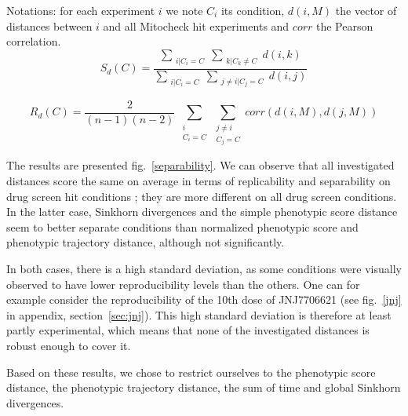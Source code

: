 Notations: for each experiment $i$ we note $C_i$ its condition, $d(i,M)$ the vector of distances between $i$ and all Mitocheck hit experiments and $corr$ the Pearson correlation.
\begin{equation}
S_d(C)=\dfrac{\sum_{\substack{i|C_i= C}} \sum_{\substack{k|C_k\neq C}} d(i,k)}{\sum_{\substack{i|C_i= C}} \sum_{\substack{j\neq i| C_j = C}} d(i,j)}
\label{sepa}
\end{equation}

\begin{equation}
R_d(C)=\dfrac{2}{(n-1)(n-2)}~ \sum_{\substack{i\\C_i= C}} \sum_{\substack{j\neq i\\ C_j = C}} corr(d(i,M), d(j,M))
\label{replica}
\end{equation}

The results are presented fig.~\ref{separability}. We can observe that all investigated distances score the same on average in terms of replicability and separability on drug screen hit conditions ; they are more different on all drug screen conditions. In the latter case, Sinkhorn divergences and the simple phenotypic score distance seem to better separate conditions than normalized phenotypic score and phenotypic trajectory distance, although not significantly. 

In both cases, there is a high standard deviation, as some conditions were visually observed to have lower reproducibility levels than the others. One can for example consider the reproducibility of the 10th dose of JNJ7706621 (see fig.~\ref{jnj} in appendix, section~\ref{sec:jnj}). This high standard deviation is therefore at least partly experimental, which means that none of the investigated distances is robust enough to cover it.

Based on these results, we chose to restrict ourselves to the phenotypic score distance, the phenotypic trajectory distance, the sum of time and global Sinkhorn divergences.


